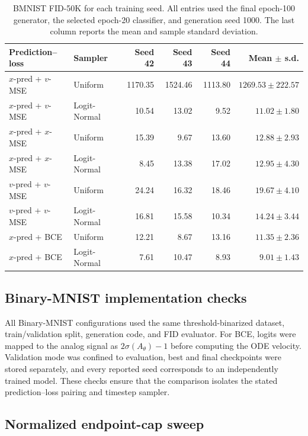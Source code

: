 \documentclass{article}
\theoremstyle{plain}
\theoremstyle{definition}
\theoremstyle{remark}
\begin{document}
\begin{table}[!htbp]
\centering
\small
\caption{BMNIST FID-50K for each training seed. All entries used the final epoch-100 generator, the selected epoch-20 classifier, and generation seed 1000. The last column reports the mean and sample standard deviation.}
\label{tab:bmnist_per_seed}
\begin{tabular}{llrrrr}
\toprule
Prediction--loss & Sampler & Seed 42 & Seed 43 & Seed 44 & Mean $\pm$ s.d. \\
\midrule
$x$-pred + $v$-MSE & Uniform & 1170.35 & 1524.46 & 1113.80 & $1269.53\pm222.57$ \\
$x$-pred + $v$-MSE & Logit-Normal & 10.54 & 13.02 & 9.52 & $11.02\pm1.80$ \\
$x$-pred + $x$-MSE & Uniform & 15.39 & 9.67 & 13.60 & $12.88\pm2.93$ \\
$x$-pred + $x$-MSE & Logit-Normal & 8.45 & 13.38 & 17.02 & $12.95\pm4.30$ \\
$v$-pred + $v$-MSE & Uniform & 24.24 & 16.32 & 18.46 & $19.67\pm4.10$ \\
$v$-pred + $v$-MSE & Logit-Normal & 16.81 & 15.58 & 10.34 & $14.24\pm3.44$ \\
$x$-pred + BCE & Uniform & 12.21 & 8.67 & 13.16 & $11.35\pm2.36$ \\
$x$-pred + BCE & Logit-Normal & 7.61 & 10.47 & 8.93 & $9.01\pm1.43$ \\
\bottomrule
\end{tabular}
\end{table}

\FloatBarrier
\subsection{Binary-MNIST implementation checks}
\label{app:bmnist_audit}

All Binary-MNIST configurations used the same threshold-binarized dataset, train/validation split, generation code, and FID evaluator. For BCE, logits were mapped to the analog signal as $2\sigma(A_\theta)-1$ before computing the ODE velocity. Validation mode was confined to evaluation, best and final checkpoints were stored separately, and every reported seed corresponds to an independently trained model. These checks ensure that the comparison isolates the stated prediction--loss pairing and timestep sampler.

\FloatBarrier
\subsection{Normalized endpoint-cap sweep}
\label{app:cap_sweep}
\end{document}
